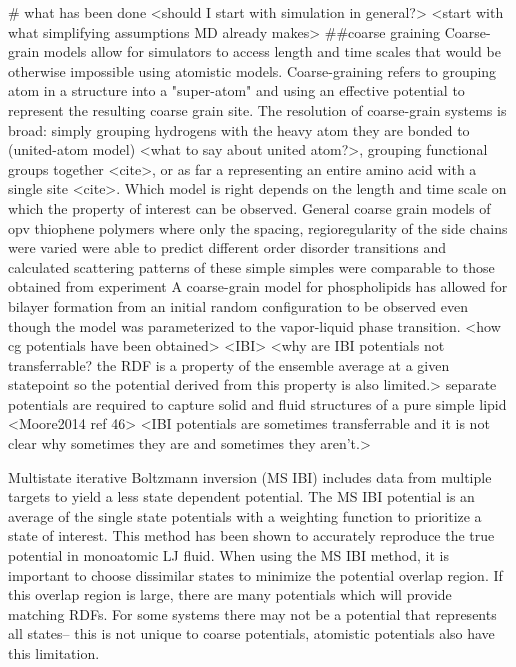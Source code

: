 # what has been done
<should I start with simulation in general?>
<start with what simplifying assumptions MD already makes>
##coarse graining
Coarse-grain models allow for simulators to access length and time scales that would be otherwise impossible using atomistic models. Coarse-graining refers to grouping atom in a structure into a "super-atom" and using an effective potential to represent the resulting coarse grain site. The resolution of coarse-grain systems is broad: simply grouping hydrogens with the heavy atom they are bonded to (united-atom model) <what to say about united atom?>\cite{Paul1995a, Yang2006a,}, grouping functional groups together <cite>, or as far a representing an entire amino acid with a single site <cite>. Which model is right depends on the length and time scale on which the property of interest can be observed. 
General coarse grain models of opv thiophene polymers where only the spacing, regioregularity of the side chains were varied were able to predict different order disorder transitions and calculated scattering patterns of these simple simples were comparable to those obtained from experiment \cite{Jankowski2013, Marsh2014} 
A coarse-grain model for phospholipids has allowed for bilayer formation from an initial random configuration to be observed even though the model was parameterized to the vapor-liquid phase transition. \cite{Shelley2001}
<how cg potentials have been obtained>
<IBI>
<why are IBI potentials not transferrable? the RDF is a property of the ensemble average at a given statepoint so the potential derived from this property is also limited.>
separate potentials are required to capture solid and fluid structures of a pure simple lipid <Moore2014 ref 46>
<IBI potentials are sometimes transferrable and it is not clear why sometimes they are and sometimes they aren't.> \cite{Moore2014}

Multistate iterative Boltzmann inversion (MS IBI) includes data from multiple targets to yield a less state dependent potential. \cite{Moore2014}
The MS IBI potential is an average of the single state potentials with a weighting function to prioritize a state of interest.
This method has been shown to accurately reproduce the true potential in monoatomic LJ fluid. 
When using the MS IBI method, it is important to choose dissimilar states to minimize the potential overlap region. If this overlap region is large, there are many potentials which will provide matching RDFs. For some systems there may not be a potential that represents all states-- this is not unique to coarse potentials, atomistic potentials also have this limitation.


